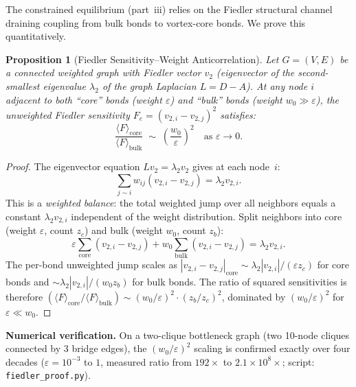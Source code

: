 \documentclass[aps,prd,onecolumn,superscriptaddress,floatfix,12pt]{revtex4-2}
\newtheorem{proposition}{Proposition}[section]
\begin{document}
The constrained equilibrium (part~iii) relies on the Fiedler structural channel draining coupling from bulk bonds to vortex-core bonds. We prove this quantitatively.

\begin{proposition}[Fiedler Sensitivity--Weight Anticorrelation]\label{prop:fiedler-anticorr}
Let $G = (V,E)$ be a connected weighted graph with Fiedler vector $v_2$ (eigenvector of the second-smallest eigenvalue $\lambda_2$ of the graph Laplacian $L = D - A$). At any node $i$ adjacent to both ``core'' bonds (weight $\varepsilon$) and ``bulk'' bonds (weight $w_0 \gg \varepsilon$), the unweighted Fiedler sensitivity $F_e = (v_{2,i} - v_{2,j})^2$ satisfies:
\begin{equation}
\frac{\langle F \rangle_{\mathrm{core}}}{\langle F \rangle_{\mathrm{bulk}}} \;\sim\; \left(\frac{w_0}{\varepsilon}\right)^2 \quad \text{as } \varepsilon \to 0.
\end{equation}
\end{proposition}

\begin{proof}
The eigenvector equation $Lv_2 = \lambda_2 v_2$ gives at each node~$i$:
\begin{equation}
\sum_{j \sim i} w_{ij}(v_{2,i} - v_{2,j}) = \lambda_2 v_{2,i}.
\end{equation}
This is a \emph{weighted balance}: the total weighted jump over all neighbors equals a constant $\lambda_2 v_{2,i}$ independent of the weight distribution. Split neighbors into core (weight $\varepsilon$, count $z_c$) and bulk (weight $w_0$, count $z_b$):
\[
\varepsilon \!\!\sum_{\mathrm{core}}\!(v_{2,i} - v_{2,j}) + w_0 \!\!\sum_{\mathrm{bulk}}\!(v_{2,i} - v_{2,j}) = \lambda_2 v_{2,i}.
\]
The per-bond unweighted jump scales as $|v_{2,i} - v_{2,j}|_{\mathrm{core}} \sim \lambda_2 |v_{2,i}| / (\varepsilon z_c)$ for core bonds and $\sim \lambda_2 |v_{2,i}| / (w_0 z_b)$ for bulk bonds. The ratio of squared sensitivities is therefore $(\langle F \rangle_{\mathrm{core}} / \langle F \rangle_{\mathrm{bulk}}) \sim (w_0/\varepsilon)^2 \cdot (z_b/z_c)^2$, dominated by $(w_0/\varepsilon)^2$ for $\varepsilon \ll w_0$.
\end{proof}

\noindent\textbf{Numerical verification.} On a two-clique bottleneck graph (two 10-node cliques connected by 3 bridge edges), the $(w_0/\varepsilon)^2$ scaling is confirmed exactly over four decades ($\varepsilon = 10^{-3}$ to $1$, measured ratio from $192\times$ to $2.1 \times 10^8 \times$; script: \texttt{fiedler\_proof.py}).
\end{document}
